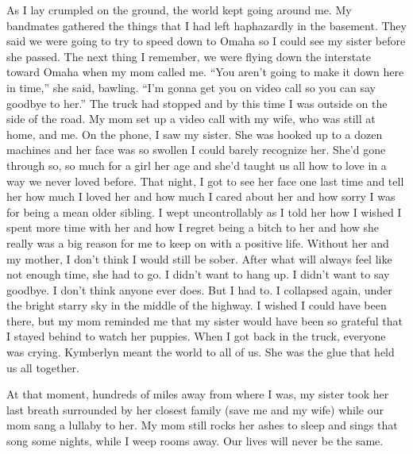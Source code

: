 \documentclass[12pt, letterpaper]{article}
\begin{document}
\begin{flushleft}
As I lay crumpled on the ground,
the world kept going around me.
My bandmates gathered the things
that I had left haphazardly in the basement.
They said we were going to try to speed down to Omaha
so I could see my sister before she passed.
The next thing I remember, we were flying down the 
interstate toward Omaha when my mom called me.
``You aren't going to make it down here in time,\@''
she said, bawling.
``I'm gonna get you on video call so you can say goodbye to her.\@''
The truck had stopped and by this time I was outside on the side of the road.
My mom set up a video call with my wife, who was still at home, and me.
On the phone, I saw my sister.
She was hooked up to a dozen machines and
her face was so swollen I could barely recognize her.
She'd gone through so, so much for a girl her age and
she'd taught us all how to love in a way we never loved before.
That night, I got to see her face one last time and tell her how much
I loved her and how much I cared about her and how sorry
I was for being a mean older sibling.
I wept uncontrollably as I told her how I wished I spent more time with her
and how I regret being a bitch to her and how she really
was a big reason for me to keep on with a positive life.
Without her and my mother, I don’t think I would still be sober.
After what will always feel like not enough time,
she had to go.
I didn’t want to hang up.
I didn’t want to say goodbye.
I don’t think anyone ever does.
But I had to.
I collapsed again, under the bright starry sky in the middle of the highway.
I wished I could have been there, but my mom reminded me that my
sister would have been so grateful that I stayed behind to watch her puppies.
When I got back in the truck, 
everyone was crying.
Kymberlyn meant the world to all of us. 
She was the glue that held us all together.
\vspace{5mm}


At that moment, hundreds of miles away from where I was,
my sister took her last breath surrounded by her closest family
(save me and my wife) while our mom sang a lullaby to her.
My mom still rocks her ashes to sleep and sings that song some nights,
while I weep rooms away.
Our lives will never be the same.






\end{flushleft}
\end{document}

